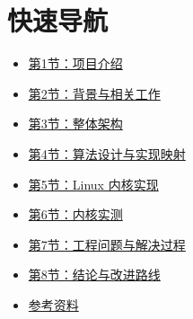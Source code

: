 
\section*{快速导航}
\begin{itemize}
    \item \hyperref[sec:intro]{第1节：项目介绍}
    \item \hyperref[sec:realtime]{第2节：背景与相关工作}
    \item \hyperref[sec:design]{第3节：整体架构}
    \item \hyperref[sec:theory]{第4节：算法设计与实现映射}
    \item \hyperref[sec:kernel]{第5节：Linux 内核实现}
    \item \hyperref[sec:test]{第6节：内核实测}
    \item \hyperref[sec:difficulties]{第7节：工程问题与解决过程}
    \item \hyperref[sec:conclusion]{第8节：结论与改进路线}
    \item \hyperref[sec:refs]{参考资料}
\end{itemize}